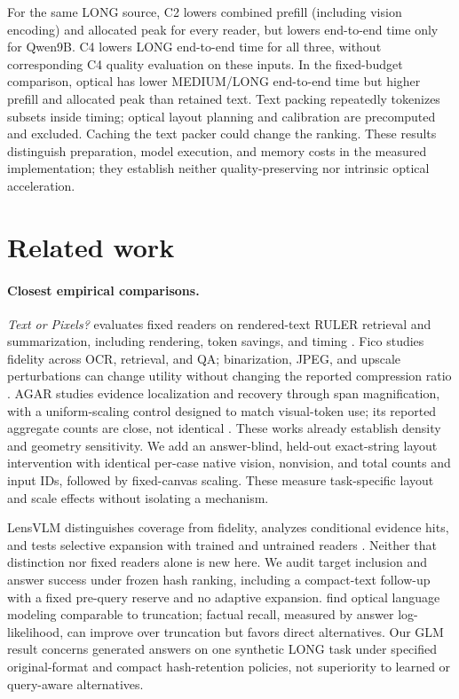 \documentclass{article}
\begin{document}
For the same LONG source, C2 lowers combined prefill (including vision encoding) and allocated peak for every reader, but lowers end-to-end time only for Qwen9B. C4 lowers LONG end-to-end time for all three, without corresponding C4 quality evaluation on these inputs. In the fixed-budget comparison, optical has lower MEDIUM/LONG end-to-end time but higher prefill and allocated peak than retained text. Text packing repeatedly tokenizes subsets inside timing; optical layout planning and calibration are precomputed and excluded. Caching the text packer could change the ranking. These results distinguish preparation, model execution, and memory costs in the measured implementation; they establish neither quality-preserving nor intrinsic optical acceleration.

\section{Related work}
\label{sec:related}
\paragraph{Closest empirical comparisons.}
\emph{Text or Pixels?} evaluates fixed readers on rendered-text RULER retrieval and summarization, including rendering, token savings, and timing \citep{textpixels}. Fico studies fidelity across OCR, retrieval, and QA; binarization, JPEG, and upscale perturbations can change utility without changing the reported compression ratio \citep{fico}. AGAR studies evidence localization and recovery through span magnification, with a uniform-scaling control designed to match visual-token use; its reported aggregate counts are close, not identical \citep{agar}. These works already establish density and geometry sensitivity. We add an answer-blind, held-out exact-string layout intervention with identical per-case native vision, nonvision, and total counts and input IDs, followed by fixed-canvas scaling. These measure task-specific layout and scale effects without isolating a mechanism.

LensVLM distinguishes coverage from fidelity, analyzes conditional evidence hits, and tests selective expansion with trained and untrained readers \citep{lensvlm}. Neither that distinction nor fixed readers alone is new here. We audit target inclusion and answer success under frozen hash ranking, including a compact-text follow-up with a fixed pre-query reserve and no adaptive expansion. \citet{badauto} find optical language modeling comparable to truncation; factual recall, measured by answer log-likelihood, can improve over truncation but favors direct alternatives. Our GLM result concerns generated answers on one synthetic LONG task under specified original-format and compact hash-retention policies, not superiority to learned or query-aware alternatives.
\end{document}
